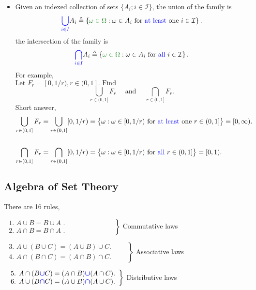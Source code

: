 \documentclass[12pt,thmsa]{article}
\begin{document}
\begin{itemize}
	\item  Given an indexed collection of sets \( \{A_{i} ; i \in \mathcal{I}\} \), the union of the family is \[ {\color{blue}{\bigcup_{i \in I}}} A_{i} \triangleq\left\{ {\color{forestgreen}{\omega \in \Omega}}: \omega \in A_{i} \text { for } {\color{blue}{ \text{at least}}} \text{ one } i \in \mathcal{I} \right\}. \]
	the intersection of the family is 
	\[ {\color{blue}{\bigcap_{i \in I}}} A_{i} \triangleq\left\{ {\color{forestgreen}{\omega \in \Omega}}: \omega \in A_{i} \text { for } {\color{blue}{ \text{all } }} i \in \mathcal{I} \right\}. \]
	For example, \\
	\(\text {Let } F_{r}=[0,1 / r), r \in(0,1] . \text { Find }\)
    \[ \bigcup_{r \in(0,1]} F_{r} \quad \text { and } \quad \bigcap_{r \in(0,1]} F_{r}.\]
    Short answer,
	\[ \begin{aligned}\bigcup_{r \in (0,1]} F_r 
    &= \bigcup_{r \in (0,1]}[0,1 / r)
      =\big\{\omega: \omega \in[0,1 / r) \text { for } {\color{blue}{\text{at least}}} \text{ one } r \in(0,1]\big\}
      = [0,\infty). \\  \\ 
    \bigcap_{r \in (0,1]} F_r 
    &= \bigcap_{r \in (0,1]}[0,1 / r)
      =\big\{\omega: \omega \in[0,1 / r) \text { for } {\color{blue}{\text{all }}} r \in(0,1]\big\} 
      = [0,1). 
    \end{aligned} \]
\end{itemize}

\subsection{Algebra of Set Theory} %
There are 16 rules,

\(\left.\begin{array}{l}\text { 1. } A \cup B=B \cup A \text { . } \\ \text { 2. } A \cap B=B \cap A \text { . }\end{array} \qquad \qquad \qquad \; \;  \right\}\) Commutative laws

\(\left.\begin{array}{l}\text { 3. } A \cup(B \cup C)=(A \cup B) \cup C. \\ \text { 4. } A \cap(B \cap C)=(A \cap B) \cap C .\end{array} \quad \quad  \right\}\) Associative laws

\(\left.\begin{array}{l}\text { 5. } A \cap(B \boldsymbol{\color{blue}{\cup}} C)=(A \cap B) \boldsymbol{\color{blue}{\cup}} (A \cap C). \\ \text { 6. } A \cup(B \boldsymbol{\color{blue}{\cap}} C)=(A \cup B) \boldsymbol{\color{blue}{\cap}} (A \cup C) .\end{array} \right\}\) Distributive laws
\end{document}
